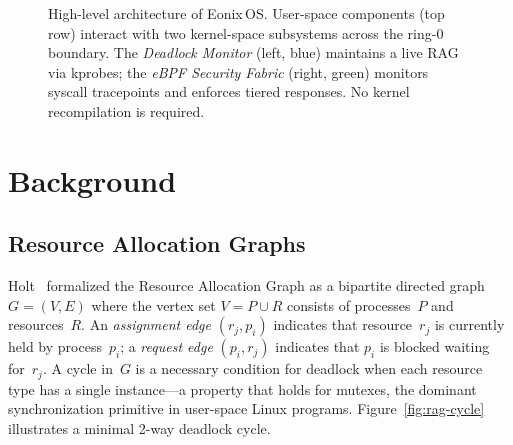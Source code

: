 \documentclass[11pt,letterpaper]{article}
\begin{document}
\begin{figure}[t]
{%
}
\caption{High-level architecture of Eonix\,OS.  User-space components
  (top row) interact with two kernel-space subsystems across the ring-0
  boundary.  The \emph{Deadlock Monitor} (left, blue) maintains a live
  RAG via kprobes; the \emph{eBPF Security Fabric} (right, green)
  monitors syscall tracepoints and enforces tiered responses.  No kernel
  recompilation is required.}
\label{fig:architecture}
\end{figure}

\section{Background}

\subsection{Resource Allocation Graphs}

Holt~\cite{holt1972} formalized the Resource Allocation Graph as a
bipartite directed graph $G = (V, E)$ where the vertex set
$V = P \cup R$ consists of processes~$P$ and resources~$R$.  An
\emph{assignment edge} $(r_j, p_i)$ indicates that resource~$r_j$ is
currently held by process~$p_i$; a \emph{request edge} $(p_i, r_j)$
indicates that $p_i$ is blocked waiting for~$r_j$.  A cycle in~$G$ is a
necessary condition for deadlock when each resource type has a single
instance---a property that holds for mutexes, the dominant
synchronization primitive in user-space Linux programs.
Figure~\ref{fig:rag-cycle} illustrates a minimal 2-way deadlock cycle.
\end{document}
